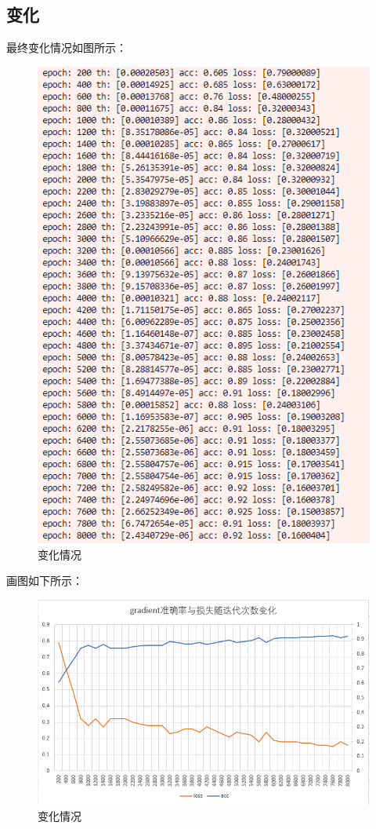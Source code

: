 \documentclass[UTF8]{ctexart}
\begin{document}
\subsection{变化}
最终变化情况如图所示：
\begin{figure}[H]
    \centering
    \includegraphics[scale=0.6]{./img/epoch.png}
    \caption{变化情况}
\end{figure}
画图如下所示：
\begin{figure}[H]
    \centering
    \includegraphics[scale=0.7]{./img/gradient_epoch.png}
    \caption{变化情况}
\end{figure}
\end{document}
